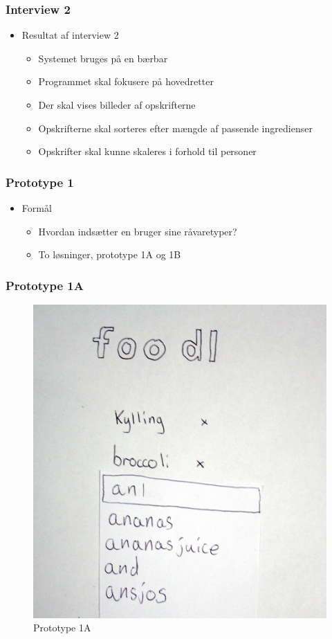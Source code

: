 \begin{frame}
\frametitle{Interview 2}
	\begin{itemize}
	\item Resultat af interview 2
			\begin{itemize}
			\item Systemet bruges på en bærbar
			\item Programmet skal fokusere på hovedretter
			\item Der skal vises billeder af opskrifterne
			\item Opskrifterne skal sorteres efter mængde af passende ingredienser
			\item Opskrifter skal kunne skaleres i forhold til personer
			\end{itemize} 
	\end{itemize}
\end{frame}

\begin{frame}
\frametitle{Prototype 1}
	\begin{itemize}
	\item Formål
			\begin{itemize}
			\item Hvordan indsætter en bruger sine råvaretyper?
			\item To løsninger, prototype 1A og 1B
			\end{itemize} 
	\end{itemize}
\end{frame}


\begin{frame}
	\frametitle{Prototype 1A}
	\begin{figure}
	\centering
	\includegraphics[scale=0.08]{billeder/prototype1a.jpg}
	\caption{Prototype 1A}
	\end{figure}
\end{frame}

